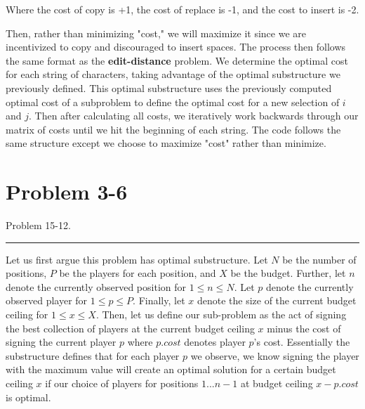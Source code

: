 \documentclass[11pt]{article}
\def\separateline{\medskip\hrule\medskip}
\begin{document}
Where the cost of copy is +1, the cost of replace is -1, and the cost to insert is -2.

Then, rather than minimizing "cost," we will maximize it since we are incentivized to copy and discouraged to insert spaces. The process then follows the same format as the \textbf{edit-distance} problem. We determine the optimal cost for each string of characters, taking advantage of the optimal substructure we previously defined. This optimal substructure uses the previously computed optimal cost of a subproblem to define the optimal cost for a new selection of $i$ and $j$. Then after calculating all costs, we iteratively work backwards through our matrix of costs until we hit the beginning of each string. The code follows the same structure except we choose to maximize "cost" rather than minimize.

\newpage

\section{Problem 3-6}
Problem 15-12.
\separateline

Let us first argue this problem has optimal substructure. Let $N$ be the number of positions, $P$ be the players for each position, and $X$ be the budget. Further, let $n$ denote the currently observed position for $1 \leq n \leq N$. Let $p$ denote the currently observed player for $1 \leq p \leq P$. Finally, let $x$ denote the size of the current budget ceiling for $1 \leq x \leq X$. Then, let us define our sub-problem as the act of signing the best collection of players at the current budget ceiling $x$ minus the cost of signing the current player $p$ where $p.cost$ denotes player $p$'s cost. Essentially the substructure defines that for each player $p$ we observe, we know signing the player with the maximum value will create an optimal solution for a certain budget ceiling $x$ if our choice of players for positions $1...n-1$ at budget ceiling $x - p.cost$ is optimal.
\end{document}
